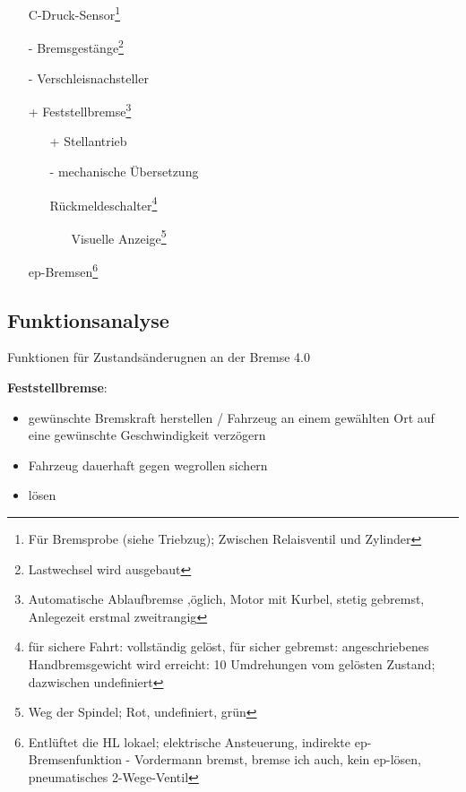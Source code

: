 \begin{itemize}
\begin{itemize}
        \item[-] Stufenweise Lastwechselumstelleinrichtung
        \begin{itemize}
            \item[+] Visuelle Zustandsanzeige
        \end{itemize}
        \item[+] Vorsteuerventil mit Rückmeldeschalter zur Lasteinstellung\footnote{bestromt=beladen; unbestromt=unbeladen}
    \end{itemize}
    \item[\textasteriskcentered] C-Druck-Sensor\footnote{Für Bremsprobe (siehe Triebzug); Zwischen Relaisventil und Zylinder}
    \item[-] Bremsgestänge\footnote{Lastwechsel wird ausgebaut}
    \item[-] Verschleisnachsteller
    \item[+] Feststellbremse\footnote{Automatische Ablaufbremse ,öglich, Motor mit Kurbel, stetig gebremst, Anlegezeit erstmal zweitrangig}
    \begin{itemize}
        \item[+] Stellantrieb
        \item[-] mechanische Übersetzung
        \item[\textasteriskcentered] Rückmeldeschalter\footnote{für sichere Fahrt: vollständig gelöst, für sicher gebremst: angeschriebenes Handbremsgewicht wird erreicht: 10 Umdrehungen vom gelösten Zustand; dazwischen undefiniert}
        \begin{itemize}
            \item[\textasteriskcentered] Visuelle Anzeige\footnote{Weg der Spindel; Rot, undefiniert, grün}
        \end{itemize}
    \end{itemize}
    \item[\textasteriskcentered] ep-Bremsen\footnote{Entlüftet die HL lokael; elektrische Ansteuerung, indirekte ep-Bremsenfunktion - Vordermann bremst, bremse ich auch, kein ep-lösen, pneumatisches 2-Wege-Ventil}
\end{itemize}

\subsection{Funktionsanalyse}
Funktionen für Zustandsänderugnen an der \gls{Bremse 4.0}
\begin{fkt} \textbf{Feststellbremse}:
\begin{itemize}
    \item gewünschte Bremskraft herstellen / Fahrzeug an einem gewählten Ort auf eine gewünschte Geschwindigkeit verzögern
    \item Fahrzeug dauerhaft gegen wegrollen sichern
    \item lösen
\end{itemize}
\end{fkt}

